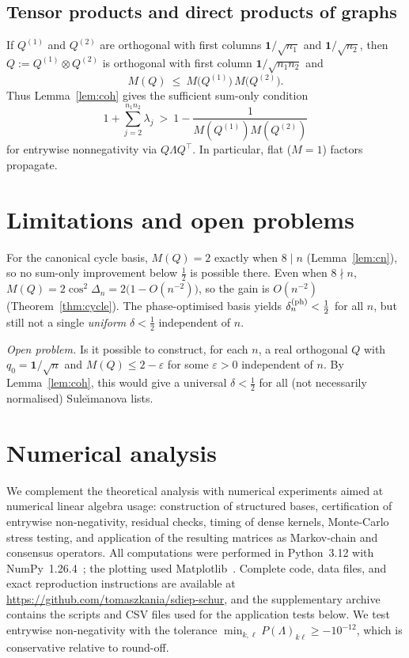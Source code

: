 \documentclass[12pt,fleqn]{amsart}
\renewcommand{\le}{\leqslant}
\renewcommand{\ge}{\geqslant}
\theoremstyle{definition}
\theoremstyle{remark}
\newcommand{\1}{\mathbf{1}}
\newcommand{\Lam}{\Lambda}
\begin{document}
\subsection*{Tensor products and direct products of graphs}
If $Q^{(1)}$ and $Q^{(2)}$ are orthogonal with first columns $\1/\sqrt{n_1}$ and $\1/\sqrt{n_2}$, then $Q:=Q^{(1)}\otimes Q^{(2)}$ is orthogonal with first column $\1/\sqrt{n_1n_2}$ and
\[
M(Q)\ \le\ M\!\big(Q^{(1)}\big)\,M\!\big(Q^{(2)}\big).
\]
Thus Lemma~\ref{lem:coh} gives the sufficient sum-only condition
\[
1+\sum_{j=2}^{n_1n_2}\lambda_j\ >\ 1-\frac{1}{M(Q^{(1)})M(Q^{(2)})}
\]
for entrywise nonnegativity via $Q\Lam Q^\top$. In particular, flat ($M=1$) factors propagate.

\section{Limitations and open problems}

For the canonical cycle basis, $M(Q)=2$ exactly when $8\mid n$ (Lemma~\ref{lem:cn}), so no sum-only improvement below $\tfrac12$ is possible there. Even when $8\nmid n$, $M(Q)=2\cos^2\Delta_n=2\bigl(1-O(n^{-2})\bigr)$, so the gain is $O(n^{-2})$ (Theorem~\ref{thm:cycle}). The phase-optimised basis yields $\delta_n^{\rm (ph)}<\tfrac12$ for all $n$, but still not a single \emph{uniform} $\delta<\tfrac12$ independent of $n$.

\medskip
\noindent\emph{Open problem.} Is it possible to construct, for each $n$, a real orthogonal $Q$ with $q_0=\1/\sqrt n$ and $M(Q)\le 2-\varepsilon$ for some $\varepsilon>0$ independent of $n$. By Lemma~\ref{lem:coh}, this would give a universal $\delta<\tfrac12$ for all (not necessarily normalised) Sule\u{\i}manova lists.

\section{Numerical analysis}\label{sec:numerics}

We complement the theoretical analysis with numerical experiments aimed at numerical linear algebra usage: construction of structured bases, certification of entrywise non-negativity, residual checks, timing of dense kernels, Monte-Carlo stress testing, and application of the resulting matrices as Markov-chain and consensus operators. All computations were performed in Python~3.12 with NumPy~1.26.4~\cite{numpy}; the plotting used Matplotlib~\cite{matplotlib}. Complete code, data files, and exact reproduction instructions are available at \url{https://github.com/tomaszkania/sdiep-schur}, and the supplementary archive contains the scripts and CSV files used for the application tests below. We test entrywise non-negativity with the tolerance $\min_{k,\ell} P(\Lambda)_{k\ell}\ge -10^{-12}$, which is conservative relative to round-off.
\end{document}
